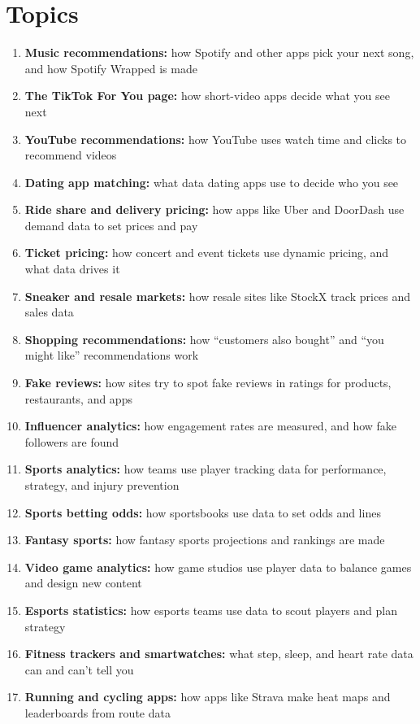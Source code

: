 \documentclass[12pt]{article}
\begin{document}
\section*{Topics}
\begin{enumerate}
    \item \textbf{Music recommendations:} how Spotify and other apps pick your next song, and how Spotify Wrapped is made
    \item \textbf{The TikTok For You page:} how short-video apps decide what you see next
    \item \textbf{YouTube recommendations:} how YouTube uses watch time and clicks to recommend videos
    \item \textbf{Dating app matching:} what data dating apps use to decide who you see
    \item \textbf{Ride share and delivery pricing:} how apps like Uber and DoorDash use demand data to set prices and pay
    \item \textbf{Ticket pricing:} how concert and event tickets use dynamic pricing, and what data drives it
    \item \textbf{Sneaker and resale markets:} how resale sites like StockX track prices and sales data
    \item \textbf{Shopping recommendations:} how ``customers also bought'' and ``you might like'' recommendations work
    \item \textbf{Fake reviews:} how sites try to spot fake reviews in ratings for products, restaurants, and apps
    \item \textbf{Influencer analytics:} how engagement rates are measured, and how fake followers are found
    \item \textbf{Sports analytics:} how teams use player tracking data for performance, strategy, and injury prevention
    \item \textbf{Sports betting odds:} how sportsbooks use data to set odds and lines
    \item \textbf{Fantasy sports:} how fantasy sports projections and rankings are made
    \item \textbf{Video game analytics:} how game studios use player data to balance games and design new content
    \item \textbf{Esports statistics:} how esports teams use data to scout players and plan strategy
    \item \textbf{Fitness trackers and smartwatches:} what step, sleep, and heart rate data can and can't tell you
    \item \textbf{Running and cycling apps:} how apps like Strava make heat maps and leaderboards from route data

\end{enumerate}
\end{document}
